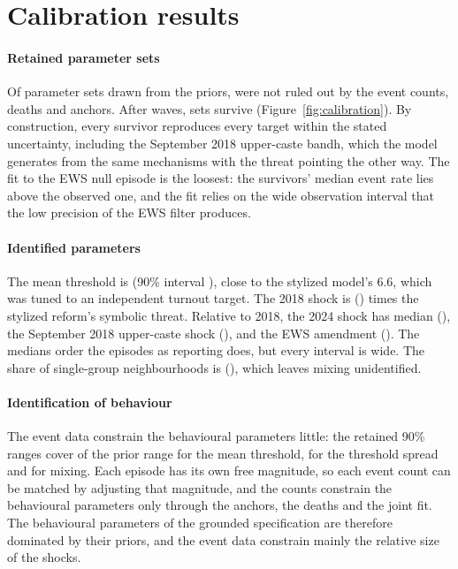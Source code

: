 \documentclass[11pt,a4paper]{article}
\begin{document}
\section{Calibration results}
\label{sec:calibration-results}

\paragraph{Retained parameter sets} Of \CalibWaveSize{} parameter sets drawn from the priors, \CalibFirstWaveKept{} were not ruled out by the event counts, deaths and anchors. After \CalibWaves{} waves, \CalibKept{} sets survive (Figure~\ref{fig:calibration}). By construction, every survivor reproduces every target within the stated uncertainty, including the September 2018 upper-caste bandh, which the model generates from the same mechanisms with the threat pointing the other way. The fit to the EWS null episode is the loosest: the survivors' median event rate lies above the observed one, and the fit relies on the wide observation interval that the low precision of the EWS filter produces.

\paragraph{Identified parameters} The mean threshold is \CalibTheta{} (90\% interval \CalibThetaInterval), close to the stylized model's 6.6, which was tuned to an independent turnout target. The 2018 shock is \CalibMagnitudeTwentyEighteen{} (\CalibMagnitudeTwentyEighteenInterval) times the stylized reform's symbolic threat. Relative to 2018, the 2024 shock has median \CalibRatioTwentyFour{} (\CalibRatioTwentyFourInterval), the September 2018 upper-caste shock \CalibRatioUpperCaste{} (\CalibRatioUpperCasteInterval), and the EWS amendment \CalibRatioEWS{} (\CalibRatioEWSInterval). The medians order the episodes as reporting does, but every interval is wide. The share of single-group neighbourhoods is \CalibMixing{} (\CalibMixingInterval), which leaves mixing unidentified.

\paragraph{Identification of behaviour} The event data constrain the behavioural parameters little: the retained 90\% ranges cover \CalibIdentTheta{} of the prior range for the mean threshold, \CalibIdentSpread{} for the threshold spread and \CalibIdentMixing{} for mixing. Each episode has its own free magnitude, so each event count can be matched by adjusting that magnitude, and the counts constrain the behavioural parameters only through the anchors, the deaths and the joint fit. The behavioural parameters of the grounded specification are therefore dominated by their priors, and the event data constrain mainly the relative size of the shocks.
\end{document}
